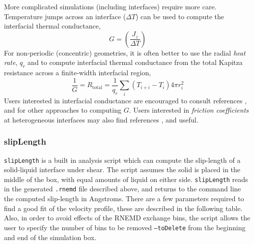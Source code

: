 \documentclass[letterpaper]{report}
\begin{document}
More complicated simulations (including interfaces) require more
care. Temperature jumps across an interface ($\Delta T$) can be used to
compute the interfacial thermal conductance,
\begin{equation}
  G=\left(\frac{J_z}{\Delta T}\right)
  \label{eq:periodicg}
\end{equation}
For non-periodic (concentric) geometries, it is often better to use
the radial \textit{heat rate}, $q_r$ and to compute interfacial
thermal conductance from the total Kapitza resistance across a
finite-width interfacial region,
\begin{equation}
  \frac{1}{G} = R_\mathrm{total} = \frac{1}{q_r} \sum_i \left(T_{i+i} -
    T_i\right) 4 \pi r_i^2 
\end{equation}
Users interested in interfacial conductance are encouraged to consult
references
,
and  for other approaches to computing
$G$. Users interested in {\it friction coefficients} at heterogeneous
interfaces may also find references
, and
 useful.

\newpage


\subsubsection{\label{section:slipLength}slipLength}
{\tt slipLength} is a built in analysis script which can compute
the slip-length of a solid-liquid interface under shear. The script assumes
the solid is placed in the middle of the box, with equal amounts of
liquid on either side. {\tt slipLength}
reads in the generated {\tt .rnemd} file described above, and returns to
the command line the computed slip-length in Angstroms. There are a few
parameters required to find a good fit of the velocity profile, these are
described in the following table. Also, in order to avoid effects of the
RNEMD exchange bins, the script allows the user to specify the number
of bins to be removed {\tt --toDelete} from the beginning and end of
the simulation box.
\end{document}
